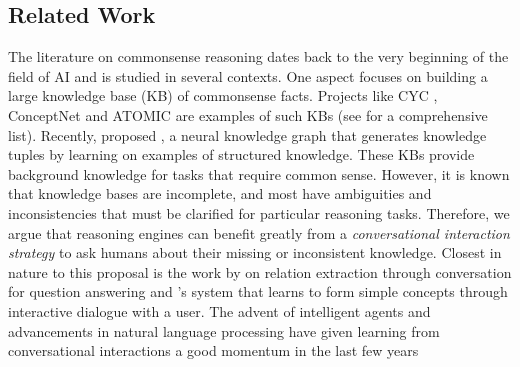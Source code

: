 \subsection{Related Work} %
The literature on commonsense reasoning dates back to the very beginning of the field of AI
\cite{winograd1972understanding,mueller2014commonsense,davis2015commonsense} and is studied in several contexts. 
One aspect focuses on building a large knowledge base (KB) of commonsense facts. %
Projects like CYC \cite{lenat1990cyc}, ConceptNet \cite{liu2004conceptnet,havasi2007conceptnet, speer2017conceptnet} and ATOMIC \cite{sap2018atomic,rashkin2018event2mind} are examples of such KBs (see \cite{davis2015commonsense} for a comprehensive list). Recently, \citet{bosselut2019comet} proposed \comet{}, a neural knowledge graph that generates knowledge tuples by learning on examples of structured knowledge.
These KBs provide background knowledge for tasks that require common sense. %
However, it is known that knowledge bases are incomplete, and most have ambiguities and inconsistencies \cite{davis2015commonsense} that must be clarified
for particular reasoning tasks. %
Therefore, we argue that 
reasoning engines can benefit greatly from a \emph{conversational interaction strategy} to ask humans about their missing or inconsistent knowledge. 
Closest in nature to this proposal is the work by \citet{hixon2015learning} on relation extraction through conversation for question answering and \citet{wu2018learning}'s system that learns to form simple concepts through interactive dialogue with a user. 
The advent of intelligent agents and advancements in natural language processing have given learning from conversational interactions a good momentum in the last few years

